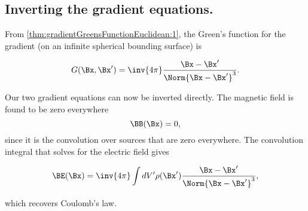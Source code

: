 \subsection{Inverting the gradient equations.}

From \cref{thm:gradientGreensFunctionEuclidean:1}, the
 Green's function for the gradient (on an infinite spherical bounding surface) is

\begin{dmath}\label{eqn:electrostatics:260}
G(\Bx, \Bx') = \inv{4 \pi} \frac{\Bx - \Bx'}{\Norm{\Bx - \Bx'}^3}.
\end{dmath}

Our two gradient equations can now be inverted directly.
The magnetic field is found to be zero everywhere
\begin{dmath}\label{eqn:electrostatics:320}
\BB(\Bx) = 0,
\end{dmath}
since it is the convolution over sources that are zero everywhere.
The convolution integral that solves for the electric field gives

\begin{dmath}\label{eqn:electrostatics:340}
\BE(\Bx) =
\inv{4 \pi} \int dV' \rho(\Bx') \frac{\Bx - \Bx'}{\Norm{\Bx - \Bx'}^3} ,
\end{dmath}

which recovers Coulomb's law.


